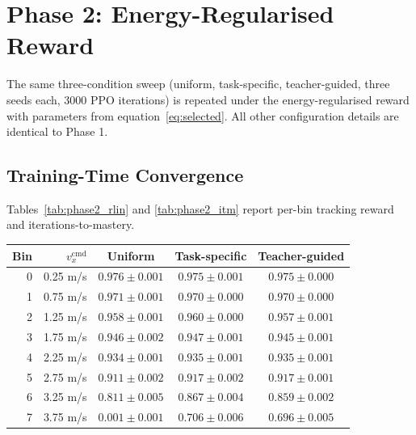 \documentclass[a4paper,11pt]{article}
\begin{document}
    \section{Phase 2: Energy-Regularised Reward}

    The same three-condition sweep (uniform, task-specific, teacher-guided, three seeds each, 3000 PPO iterations) is repeated under the energy-regularised reward with parameters from equation~\eqref{eq:selected}. All other configuration details are identical to Phase 1.

    \subsection{Training-Time Convergence}

    Tables~\ref{tab:phase2_rlin} and \ref{tab:phase2_itm} report per-bin tracking reward and iterations-to-mastery.

    \begin{center}
    \begin{tabular}{@{}r r c c c@{}}
    \toprule
    \textbf{Bin} & $v_x^{\mathrm{cmd}}$ & \textbf{Uniform} & \textbf{Task-specific} & \textbf{Teacher-guided} \\
    \midrule
    0 & 0.25 m/s & $0.976 \pm 0.001$ & $0.975 \pm 0.001$ & $0.975 \pm 0.000$ \\
    1 & 0.75 m/s & $0.971 \pm 0.001$ & $0.970 \pm 0.000$ & $0.970 \pm 0.000$ \\
    2 & 1.25 m/s & $0.958 \pm 0.001$ & $0.960 \pm 0.000$ & $0.957 \pm 0.001$ \\
    3 & 1.75 m/s & $0.946 \pm 0.002$ & $0.947 \pm 0.001$ & $0.945 \pm 0.001$ \\
    4 & 2.25 m/s & $0.934 \pm 0.001$ & $0.935 \pm 0.001$ & $0.935 \pm 0.001$ \\
    5 & 2.75 m/s & $0.911 \pm 0.002$ & $0.917 \pm 0.002$ & $0.917 \pm 0.001$ \\
    6 & 3.25 m/s & $0.811 \pm 0.005$ & $0.867 \pm 0.004$ & $0.859 \pm 0.002$ \\
    7 & 3.75 m/s & $0.001 \pm 0.001$ & $0.706 \pm 0.006$ & $0.696 \pm 0.005$ \\
    \bottomrule
    \end{tabular}
    \label{tab:phase2_rlin}
    \end{center}
\end{document}
